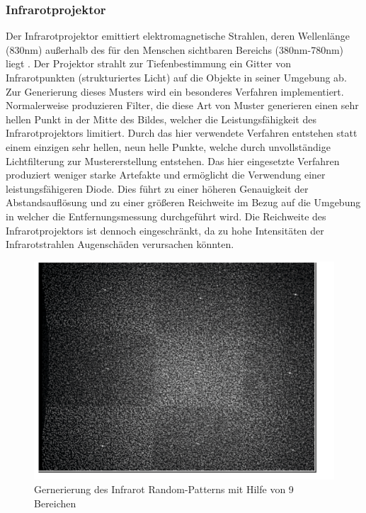 \subsubsection{Infrarotprojektor}
Der Infrarotprojektor emittiert elektromagnetische Strahlen, deren Wellenlänge (830nm) außerhalb des für den Menschen sichtbaren Bereichs (380nm-780nm) liegt .
Der Projektor strahlt zur Tiefenbestimmung ein Gitter von Infrarotpunkten (strukturiertes Licht) auf die Objekte in seiner Umgebung ab. 
Zur Generierung dieses Musters wird ein besonderes Verfahren implementiert.
Normalerweise produzieren Filter, die diese Art von Muster generieren einen sehr hellen Punkt in der Mitte des Bildes, welcher die Leistungsfähigkeit des Infrarotprojektors limitiert. Durch das hier verwendete Verfahren entstehen statt einem einzigen sehr hellen, neun helle Punkte, welche durch unvollständige Lichtfilterung zur Mustererstellung entstehen. Das hier eingesetzte Verfahren produziert weniger starke Artefakte und ermöglicht die Verwendung einer leistungsfähigeren Diode. Dies führt zu einer höheren Genauigkeit der Abstandsauflösung und zu einer größeren Reichweite im Bezug auf die Umgebung in welcher die Entfernungsmessung durchgeführt wird. Die Reichweite des Infrarotprojektors ist dennoch eingeschränkt, da zu hohe Intensitäten der Infrarotstrahlen Augenschäden verursachen könnten.
\begin{figure}
\centering
\includegraphics[width=0.5\linewidth]{./Res/9_Dots}
\caption{Gernerierung des Infrarot Random-Patterns mit Hilfe von 9 Bereichen}
\label{fig:9_Dots}
\end{figure}
\FloatBarrier

